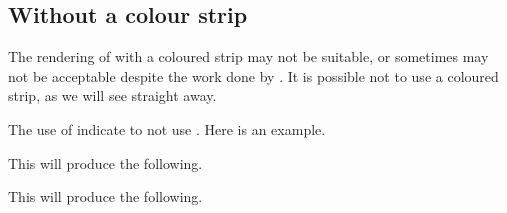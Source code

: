 \documentclass[12pt, a4paper]{tutodoc}
\begin{document}
\subsection{Without a colour strip}

The rendering of  with a coloured strip may not be suitable, or sometimes may not be acceptable despite the work done by .
It is possible not to use a coloured strip, as we will see straight away.


\begin{tdocexa}
    The use of  indicate to not use .
    Here is an example.


    This will produce the following.

    \medskip

    
\end{tdocexa}




\begin{tdocexa}
    \leavevmode


    This will produce the following.

    \medskip

    
\end{tdocexa}
\end{document}
